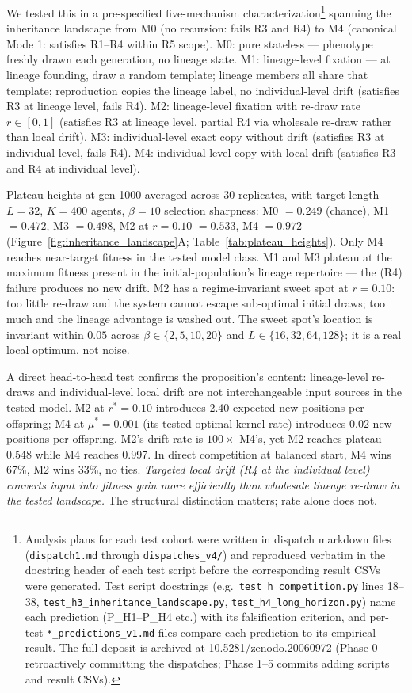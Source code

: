 \documentclass[aps,prx,reprint,amsmath,amssymb,floatfix,superscriptaddress,nofootinbib]{revtex4-2}
\newcommand{\zenodoDOI}{\href{https://doi.org/10.5281/zenodo.20060972}{10.5281/zenodo.20060972}}
\theoremstyle{plain-thm}
\theoremstyle{definition-thm}
\begin{document}
We tested this in a pre-specified five-mechanism characterization\footnote{Analysis plans for each test cohort were written in dispatch markdown files (\texttt{dispatch1.md} through \texttt{dispatches\_v4/}) and reproduced verbatim in the docstring header of each test script before the corresponding result CSVs were generated. Test script docstrings (e.g.\ \texttt{test\_h\_competition.py} lines 18--38, \texttt{test\_h3\_inheritance\_landscape.py}, \texttt{test\_h4\_long\_horizon.py}) name each prediction (P\_H1--P\_H4 etc.) with its falsification criterion, and per-test \texttt{*\_predictions\_v1.md} files compare each prediction to its empirical result. The full deposit is archived at \zenodoDOI{} (Phase 0 retroactively committing the dispatches; Phase 1--5 commits adding scripts and result CSVs).} spanning the inheritance landscape from M0 (no recursion: fails R3 and R4) to M4 (canonical Mode 1: satisfies R1--R4 within R5 scope). M0: pure stateless --- phenotype freshly drawn each generation, no lineage state. M1: lineage-level fixation --- at lineage founding, draw a random template; lineage members all share that template; reproduction copies the lineage label, no individual-level drift (satisfies R3 at lineage level, fails R4). M2: lineage-level fixation with re-draw rate $r \in [0, 1]$ (satisfies R3 at lineage level, partial R4 via wholesale re-draw rather than local drift). M3: individual-level exact copy without drift (satisfies R3 at individual level, fails R4). M4: individual-level copy with local drift (satisfies R3 and R4 at individual level).

Plateau heights at gen 1000 averaged across 30 replicates, with target length $L = 32$, $K = 400$ agents, $\beta = 10$ selection sharpness: M0 $= 0.249$ (chance), M1 $= 0.472$, M3 $= 0.498$, M2 at $r = 0.10$ $= 0.533$, M4 $= 0.972$ (Figure~\ref{fig:inheritance_landscape}A; Table~\ref{tab:plateau_heights}). Only M4 reaches near-target fitness in the tested model class. M1 and M3 plateau at the maximum fitness present in the initial-population's lineage repertoire --- the (R4) failure produces no new drift. M2 has a regime-invariant sweet spot at $r = 0.10$: too little re-draw and the system cannot escape sub-optimal initial draws; too much and the lineage advantage is washed out. The sweet spot's location is invariant within $0.05$ across $\beta \in \{2, 5, 10, 20\}$ and $L \in \{16, 32, 64, 128\}$; it is a real local optimum, not noise.

A direct head-to-head test confirms the proposition's content: lineage-level re-draws and individual-level local drift are not interchangeable input sources in the tested model. M2 at $r^* = 0.10$ introduces 2.40 expected new positions per offspring; M4 at $\mu^* = 0.001$ (its tested-optimal kernel rate) introduces 0.02 new positions per offspring. M2's drift rate is $100\times$ M4's, yet M2 reaches plateau 0.548 while M4 reaches 0.997. In direct competition at balanced start, M4 wins 67\%, M2 wins 33\%, no ties. \textit{Targeted local drift (R4 at the individual level) converts input into fitness gain more efficiently than wholesale lineage re-draw in the tested landscape.} The structural distinction matters; rate alone does not.
\end{document}
